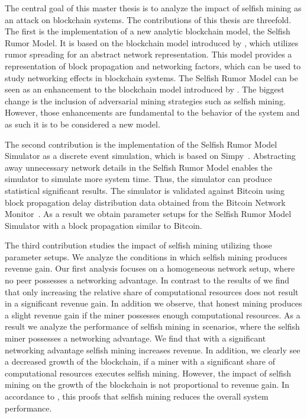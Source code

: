 The central goal of this master thesis is to analyze the impact of selfish mining as an attack on blockchain systems. The contributions of this thesis are threefold. The first is the implementation of a new analytic blockchain model, the Selfish Rumor Model. It is based on the blockchain model introduced by \gopalan , which utilizes rumor spreading for an abstract network representation. This model provides a representation of block propagation and networking factors, which can be used to study networking effects in blockchain systems. The Selfish Rumor Model can be seen as an enhancement to the blockchain model introduced by \gopalan . The biggest change is the inclusion of adversarial mining strategies such as selfish mining. However, those enhancements are fundamental to the behavior of the system and as such it is to be considered a new model.

The second contribution is the implementation of the Selfish Rumor Model Simulator as a discrete event simulation, which is based on Simpy~\cite{simpy}.
Abstracting away unnecessary network details in the Selfish Rumor Model enables the simulator to simulate more system time. Thus, the simulator can produce statistical significant results. The simulator is validated against Bitcoin using block propagation delay distribution data obtained from the Bitcoin Network Monitor~\cite{BitcoinNetworkMonitor}. As a result we obtain parameter setups for the Selfish Rumor Model Simulator with a block propagation similar to Bitcoin.

The third contribution studies the impact of selfish mining utilizing those parameter setups. We analyze the conditions in which selfish mining produces revenue gain. Our first analysis focuses on a homogeneous network setup, where no peer possesses a networking advantage. In contrast to the results of \citeauthor{eyal} we find that only increasing the relative share of computational resources does not result in a significant revenue gain. In addition we observe, that honest mining produces a slight revenue gain if the miner possesses enough computational resources.
As a result we analyze the performance of selfish mining in scenarios, where the selfish miner possesses a networking advantage. We find that with a significant networking advantage selfish mining increases revenue.
In addition, we clearly see a decreased growth of the blockchain, if a miner with a significant share of computational resources executes selfish mining. However, the impact of selfish mining on the growth of the blockchain is not proportional to revenue gain. In accordance to \citeauthor{eyal}, this proofs that selfish mining reduces the overall system performance.





